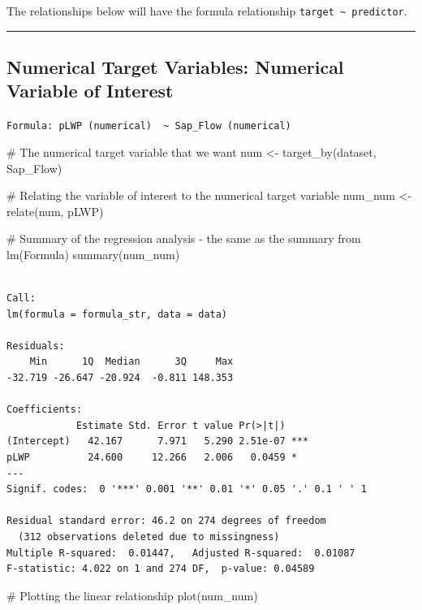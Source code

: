 \documentclass[
  letterpaper,
  DIV=11,
  numbers=noendperiod]{scrreprt}
\newenvironment{Shaded}{\begin{snugshade}}{\end{snugshade}}
\newcommand{\CommentTok}[1]{\textcolor[rgb]{0.37,0.37,0.37}{#1}}
\newcommand{\FunctionTok}[1]{\textcolor[rgb]{0.28,0.35,0.67}{#1}}
\newcommand{\NormalTok}[1]{\textcolor[rgb]{0.00,0.23,0.31}{#1}}
\newcommand{\OtherTok}[1]{\textcolor[rgb]{0.00,0.23,0.31}{#1}}
\begin{document}
The relationships below will have the formula relationship
\texttt{target\ \textasciitilde{}\ predictor}.

\begin{center}\rule{0.5\linewidth}{0.5pt}\end{center}

\hypertarget{numerical-target-variables-numerical-variable-of-interest}{%
\subsection{Numerical Target Variables: Numerical Variable of
Interest}\label{numerical-target-variables-numerical-variable-of-interest}}

\texttt{Formula:\ pLWP\ (numerical)\ \ \textasciitilde{}\ Sap\_Flow\ (numerical)}

\begin{Shaded}
\begin{Highlighting}[]
\CommentTok{\# The numerical target variable that we want}
\NormalTok{num }\OtherTok{\textless{}{-}} \FunctionTok{target\_by}\NormalTok{(dataset, Sap\_Flow)}

\CommentTok{\# Relating the variable of interest to the numerical target variable}
\NormalTok{num\_num }\OtherTok{\textless{}{-}} \FunctionTok{relate}\NormalTok{(num, pLWP)}

\CommentTok{\# Summary of the regression analysis {-} the same as the summary from lm(Formula)}
\FunctionTok{summary}\NormalTok{(num\_num)}
\end{Highlighting}
\end{Shaded}

\begin{verbatim}

Call:
lm(formula = formula_str, data = data)

Residuals:
    Min      1Q  Median      3Q     Max 
-32.719 -26.647 -20.924  -0.811 148.353 

Coefficients:
            Estimate Std. Error t value Pr(>|t|)    
(Intercept)   42.167      7.971   5.290 2.51e-07 ***
pLWP          24.600     12.266   2.006   0.0459 *  
---
Signif. codes:  0 '***' 0.001 '**' 0.01 '*' 0.05 '.' 0.1 ' ' 1

Residual standard error: 46.2 on 274 degrees of freedom
  (312 observations deleted due to missingness)
Multiple R-squared:  0.01447,   Adjusted R-squared:  0.01087 
F-statistic: 4.022 on 1 and 274 DF,  p-value: 0.04589
\end{verbatim}

\begin{Shaded}
\begin{Highlighting}[]
\CommentTok{\# Plotting the linear relationship}
\FunctionTok{plot}\NormalTok{(num\_num)}
\end{Highlighting}
\end{Shaded}
\end{document}
